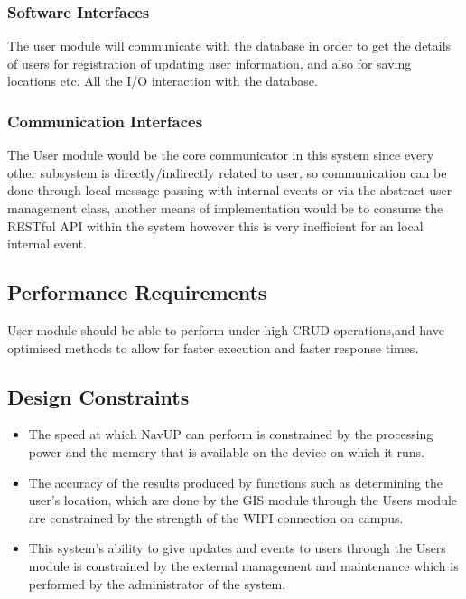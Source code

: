 	\subsubsection{Software Interfaces } 
	The user module will communicate with the database in order to get the details of users for registration of updating user information, and also for saving locations etc. All the I/O interaction with the database.
	\subsubsection{Communication Interfaces } 

	The User module would be the core communicator in this system since every other subsystem is directly/indirectly related to user, so communication can be done through local message passing with internal events or via the abstract user management class, another means of implementation would be to consume the RESTful API within the system however this is very inefficient for an local internal event.



	
\subsection{Performance Requirements} %
User module should be able to perform under high CRUD operations,and have optimised methods to allow for faster execution and faster response times.


\subsection{Design Constraints}
\begin{itemize}

\item The speed at which NavUP can perform is constrained by the processing power and the  memory that is available on the device on which it runs.

\item The accuracy of the results produced by functions such as determining the user's location, which are done by the GIS module through the Users module are constrained by the strength of the WIFI connection on campus.

\item This system’s ability to give updates and events to users through the Users module is constrained by the external management and maintenance which is performed by the administrator of the system.

\end{itemize}


